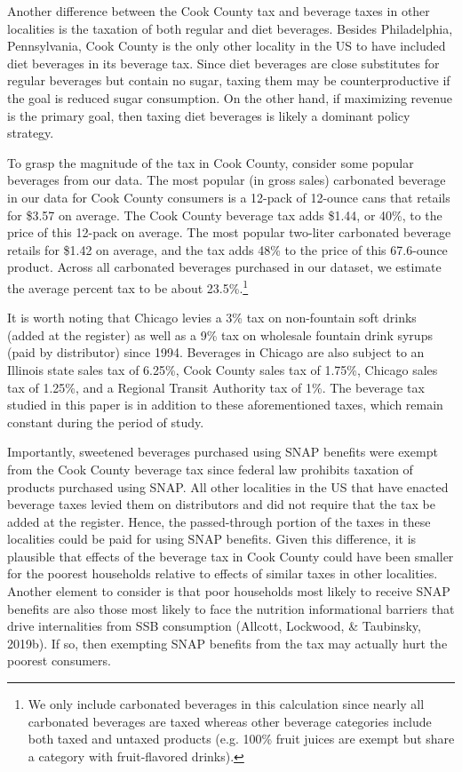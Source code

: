 \documentclass[12pt]{article}
\begin{document}
Another difference between the Cook County tax and beverage taxes in other localities is the taxation of both regular and diet beverages. Besides Philadelphia, Pennsylvania, Cook County is the only other locality in the US to have included diet beverages in its beverage tax. Since diet beverages are close substitutes for regular beverages but contain no sugar, taxing them may be counterproductive if the goal is reduced sugar consumption. On the other hand, if maximizing revenue is the primary goal, then taxing diet beverages is likely a dominant policy strategy.

To grasp the magnitude of the tax in Cook County, consider some popular beverages from our data. The most popular (in gross sales) carbonated beverage in our data for Cook County consumers is a 12-pack of 12-ounce cans that retails for \$3.57 on average. The Cook County beverage tax adds \$1.44, or 40\%, to the price of this 12-pack on average. The most popular two-liter carbonated beverage retails for \$1.42 on average, and the tax adds 48\% to the price of this 67.6-ounce product. Across all carbonated beverages purchased in our dataset, we estimate the average percent tax to be about 23.5\%.\footnote{We only include carbonated beverages in this calculation since nearly all carbonated beverages are taxed whereas other beverage categories include both taxed and untaxed products (e.g. 100\% fruit juices are exempt but share a category with fruit-flavored drinks).}

It is worth noting that Chicago levies a 3\% tax on non-fountain soft drinks (added at the register) as well as a 9\% tax on wholesale fountain drink syrups (paid by distributor) since 1994. Beverages in Chicago are also subject to an Illinois state sales tax of 6.25\%, Cook County sales tax of 1.75\%, Chicago sales tax of 1.25\%, and a Regional Transit Authority tax of 1\%. The beverage tax studied in this paper is in addition to these aforementioned taxes, which remain constant during the period of study.

Importantly, sweetened beverages purchased using SNAP benefits were exempt from the Cook County beverage tax since federal law prohibits taxation of products purchased using SNAP. All other localities in the US that have enacted beverage taxes levied them on distributors and did not require that the tax be added at the register. Hence, the passed-through portion of the taxes in these localities could be paid for using SNAP benefits. Given this difference, it is plausible that effects of the beverage tax in Cook County could have been smaller for the poorest households relative to effects of similar taxes in other localities. Another element to consider is that poor households most likely to receive SNAP benefits are also those most likely to face the nutrition informational barriers that drive internalities from SSB consumption (Allcott, Lockwood, \& Taubinsky, 2019b). %
If so, then exempting SNAP benefits from the tax may actually hurt the poorest consumers.
\end{document}
